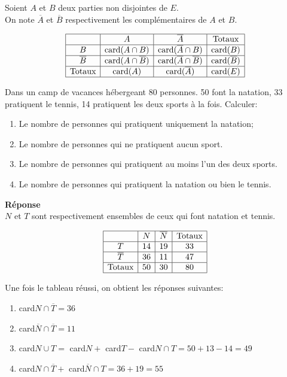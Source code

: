  Soient $ A$ et $B $ deux parties  non disjointes de $ E $.\\
On note $\overline{A} $ et  $\overline{B} $ respectivement les complémentaires de $ A$ et $B $.

$$
\begin{array}{|c|c|c|c|}
\hline
     & A & \overline{A} & \text{Totaux} \\
\hline
B & \text{card}(A \cap B) & \text{card}(\overline{A} \cap B) & \text{card}(B) \\
\hline
\overline{B} & \text{card}(A \cap \overline{B}) & \text{card}(\overline{A} \cap \overline{B}) & \text{card}(\overline{B}) \\
\hline
\text{Totaux} & \text{card}(A) & \text{card}(\overline{A}) & \text{card}(E) \\
\hline
\end{array}
$$



\begin{exercice}
Dans un camp de vacances hébergeant 80 personnes. 50 font la natation, 33 pratiquent le tennis, 14 pratiquent les deux sports à la fois. Calculer:
\begin{enumerate}
\item Le nombre de personnes qui pratiquent uniquement la natation;
\item Le nombre de personnes qui ne pratiquent aucun sport.
\item Le nombre de personnes qui pratiquent au moins l'un des deux sports.
\item  Le nombre de personnes qui pratiquent la natation ou bien le tennis.
\end{enumerate}
\end{exercice}
\textbf{Réponse}\\
$ N$ et $T $ sont respectivement ensembles de ceux qui font natation et tennis.

$$
\begin{array}{|c|c|c|c|}
\hline
      & N & \overline{N} & \text{Totaux} \\
\hline
T     & 14 & 19 & 33 \\
\hline
\overline{T} & 36 & 11 & 47 \\
\hline
\text{Totaux} & 50 & 30 & 80 \\
\hline
\end{array}
$$



Une fois le tableau réussi, on obtient les réponses suivantes:
\begin{enumerate}
\item card$ N\cap \overline{T} =36$
\item card$ \overline{N} \cap \overline{T}=11 $
\item card$ N \cup T =$ card$ N + $ card$ T -$ card$ N \cap T = 50+13-14=49$
\item card$ N\cap \overline{T} +$ card$ \overline{N}\cap T= 36+19=55 $
\end{enumerate}

